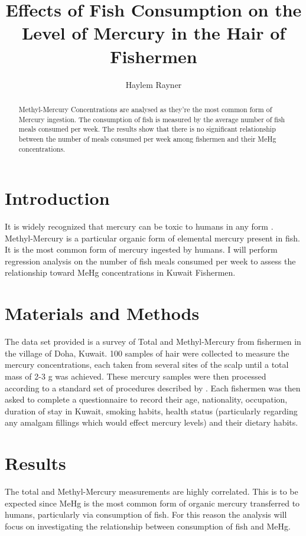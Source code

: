 \documentclass[twocolumn, 12pt]{report}
\title{Effects of Fish Consumption on the Level of Mercury in the Hair of Fishermen}
\author{Haylem Rayner}
\begin{document}

\maketitle

\begin{abstract}
	Methyl-Mercury Concentrations are analysed as they're the most common form of Mercury ingestion. The consumption of fish is measured by the average number of fish meals consumed per week. The results show that there is no significant relationship between the number of meals consumed per week among fishermen and their MeHg concentrations.
\end{abstract}


\section{Introduction}

It is widely recognized that mercury can be toxic to humans in any form \cite{kim2016review}. Methyl-Mercury is a particular organic form of elemental mercury present in fish. It is the most common form of mercury ingested by humans. I will perform regression analysis on the number of fish meals consumed per week to assess the relationship toward MeHg concentrations in Kuwait Fishermen.



\section{Materials and Methods}

The data set provided is a survey of Total and Methyl-Mercury from fishermen in the village of Doha, Kuwait. 100 samples of hair were collected to measure the mercury concentrations, each taken from several sites of the scalp until a total mass of 2-3 g was achieved. These mercury samples were then processed according to a standard set of procedures described by \cite{al2000factors}. Each fishermen was then asked to complete a questionnaire to record their age, nationality, occupation, duration of stay in Kuwait, smoking habits, health status (particularly regarding any amalgam fillings which would effect mercury levels) and their dietary habits. 


\section{Results}

The total and Methyl-Mercury measurements are highly correlated. This is to be expected since MeHg is the most common form of organic mercury transferred to humans, particularly via consumption of fish. For this reason the analysis will focus on investigating the relationship between consumption of fish and MeHg.
\end{document}

